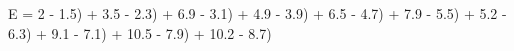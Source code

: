 \documentclass[preview]{standalone}
\begin{document}
\begin{center}
E = 2 - 1.5) + 3.5 - 2.3) + 6.9 - 3.1) + 4.9 - 3.9) + 6.5 - 4.7) + 7.9 - 5.5) + 5.2 - 6.3) + 9.1 - 7.1) + 10.5 - 7.9) + 10.2 - 8.7)
\end{center}
\end{document}
